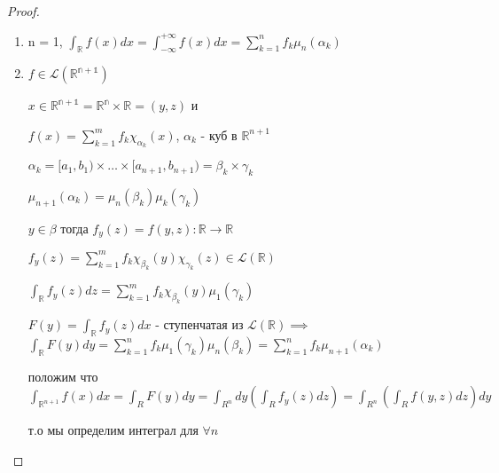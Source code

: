 \documentclass[a4paper, 12pt]{article}
\theoremstyle{definition}
\theoremstyle{remark}
\begin{document}
     \begin{proof}
          \begin{enumerate}
               \item n = 1, $\int_\mathbb{R} f(x)dx = \int_{-\infty}^{+\infty}f(x)dx = \sum_{k=1}^n f_k \mu_n(\alpha_k)$
               \item $f\in\mathcal{L}(\mathbb{R^{n+1}})$
               
               $x\in\mathbb{R^{n+1}} = \mathbb{R^{n}}\times\mathbb{R} = (y, z)$ и

               $f(x) = \sum_{k =1}^m f_k \chi_{\alpha_k}(x)$, $\alpha_k$ - куб в $\mathbb{R} ^{n+1}$

               $\alpha_k = [a_1, b_1)\times\dots\times[a_{n+1}, b_{n+1}) = \beta_k\times\gamma_k$

               $\mu_{n+1}(\alpha_k) = \mu_n(\beta_k)\mu_k(\gamma_k)$

               $y\in\beta$ тогда $f_y(z) = f(y, z): \mathbb{R} \to\mathbb{R} $

               $f_y(z) = \sum_{k=1}^m f_k \chi_{\beta_k}(y)\chi_{\gamma_k}(z) \in \mathcal{L}(\mathbb{R})$

               $\int_\mathbb{R} f_y(z)dz = \sum_{k=1}^m f_k \chi_{\beta_k}(y)\mu_1(\gamma_k)$

               $F(y) = \int_\mathbb{R} f_y(z)dx$ -  ступенчатая из $\mathcal{L}(\mathbb{R})\implies$
               $\int_\mathbb{R} F(y)dy = \sum_{k=1}^n f_k \mu_1(\gamma_k) \mu_n(\beta_k) = \sum_{k=1}^n f_k \mu_{n+1}(\alpha_k)$

               положим что $\int_{\mathbb{R} ^{n+1}}f(x)dx = \int_R F(y)dy = \int_{R^n} dy (\int_R f_y(z)dz) = \int_{R^n}(\int_R f(y,z)dz)dy$

               т.о мы определим интеграл для $\forall n$
          \end{enumerate}
     \end{proof}
\end{document}
